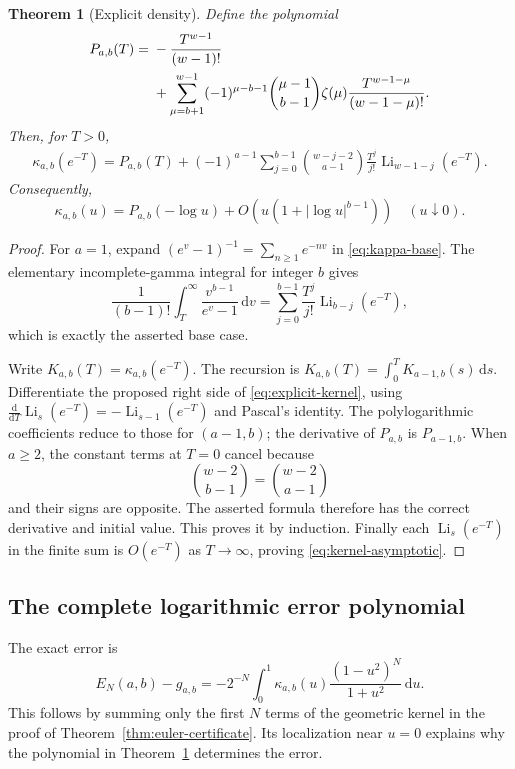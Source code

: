 \documentclass[11pt,a4paper]{article}
\numberwithin{equation}{section}
\newtheorem{theorem}{Theorem}[section]
\theoremstyle{definition}
\theoremstyle{remark}
\newcommand{\Li}{\operatorname{Li}}
\newcommand{\dd}{\,\mathrm{d}}
\begin{document}
\begin{theorem}[Explicit density]\label{thm:explicit-kernel}
Define the polynomial
\begin{align}\label{eq:P-ab}
 P_{a,b}(T)={}&-\frac{T^{w-1}}{(w-1)!}\notag\\
 &+\sum_{\mu=b+1}^{w-1}(-1)^{\mu-b-1}\binom{\mu-1}{b-1}
       \zeta(\mu)\frac{T^{w-1-\mu}}{(w-1-\mu)!}.
\end{align}
Then, for $T>0$,
\begin{align}\label{eq:explicit-kernel}
 \kappa_{a,b}(e^{-T})=P_{a,b}(T)
 +(-1)^{a-1}\sum_{j=0}^{b-1}\binom{w-j-2}{a-1}
       \frac{T^j}{j!}\Li_{w-1-j}(e^{-T}).
\end{align}
Consequently,
\begin{equation}\label{eq:kernel-asymptotic}
 \kappa_{a,b}(u)=P_{a,b}(-\log u)
       +O\!\left(u(1+|\log u|^{b-1})\right)\quad(u\downarrow0).
\end{equation}
\end{theorem}
\begin{proof}
For $a=1$, expand $(e^v-1)^{-1}=\sum_{n\ge1}e^{-nv}$ in \eqref{eq:kappa-base}. The elementary incomplete-gamma integral for integer $b$ gives
\[
 \frac1{(b-1)!}\int_T^\infty\frac{v^{b-1}}{e^v-1}\dd v
 =\sum_{j=0}^{b-1}\frac{T^j}{j!}\Li_{b-j}(e^{-T}),
\]
which is exactly the asserted base case.

Write $K_{a,b}(T)=\kappa_{a,b}(e^{-T})$. The recursion is
$K_{a,b}(T)=\int_0^T K_{a-1,b}(s)\dd s$. Differentiate the proposed right side of \eqref{eq:explicit-kernel}, using
$\frac{\mathrm d}{\mathrm dT}\Li_s(e^{-T})=-\Li_{s-1}(e^{-T})$ and Pascal's identity. The polylogarithmic coefficients reduce to those for $(a-1,b)$; the derivative of $P_{a,b}$ is $P_{a-1,b}$. When $a\ge2$, the constant terms at $T=0$ cancel because
\[
 \binom{w-2}{b-1}=\binom{w-2}{a-1}
\]
and their signs are opposite. The asserted formula therefore has the correct derivative and initial value. This proves it by induction. Finally each $\Li_s(e^{-T})$ in the finite sum is $O(e^{-T})$ as $T\to\infty$, proving \eqref{eq:kernel-asymptotic}.
\end{proof}

\subsection{The complete logarithmic error polynomial}
The exact error is
\begin{equation}\label{eq:exact-error}
 E_N(a,b)-g_{a,b}
 =-2^{-N}\int_0^1\kappa_{a,b}(u)
                    \frac{(1-u^2)^N}{1+u^2}\dd u.
\end{equation}
This follows by summing only the first $N$ terms of the geometric kernel in the proof of Theorem~\ref{thm:euler-certificate}. Its localization near $u=0$ explains why the polynomial in Theorem~\ref{thm:explicit-kernel} determines the error.
\end{document}
